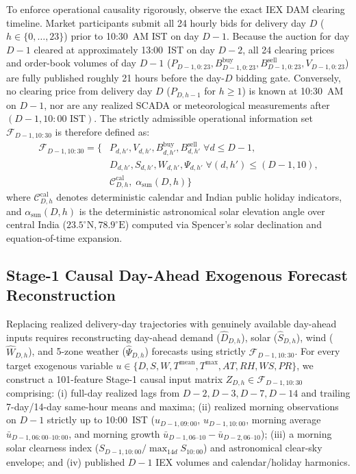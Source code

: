 \documentclass[journal,10pt,twocolumn]{IEEEtran}
\begin{document}
To enforce operational causality rigorously, observe the exact IEX DAM clearing timeline. Market participants submit all 24 hourly bids for delivery day $D$ ($h \in \{0, \dots, 23\}$) prior to 10:30~AM IST on day $D-1$. Because the auction for day $D-1$ cleared at approximately 13:00~IST on day $D-2$, all 24 clearing prices and order-book volumes of day $D-1$ ($P_{D-1, 0:23}, B_{D-1, 0:23}^{\text{buy}}, B_{D-1, 0:23}^{\text{sell}}, V_{D-1, 0:23}$) are fully published roughly 21 hours before the day-$D$ bidding gate. Conversely, no clearing price from delivery day $D$ ($P_{D, h-1}$ for $h \ge 1$) is known at 10:30~AM on $D-1$, nor are any realized SCADA or meteorological measurements after $(D-1, 10:00\text{~IST})$. The strictly admissible operational information set $\mathcal{F}_{D-1, 10:30}$ is therefore defined as:
\begin{equation}
\begin{aligned}
\mathcal{F}_{D-1, 10:30} = \Big\{ & P_{d, h'}, V_{d, h'}, B_{d, h'}^{\text{buy}}, B_{d, h'}^{\text{sell}} \;\forall d \le D-1, \\
& D_{d, h'}, S_{d, h'}, W_{d, h'}, \Psi_{d, h'} \;\forall (d, h') \le (D-1, 10), \\
& \mathcal{C}_{D,h}^{\text{cal}}, \; \alpha_{\text{sun}}(D,h) \Big\}
\end{aligned}
\label{eq:strict_causal_gate}
\end{equation}
where $\mathcal{C}_{D,h}^{\text{cal}}$ denotes deterministic calendar and Indian public holiday indicators, and $\alpha_{\text{sun}}(D,h)$ is the deterministic astronomical solar elevation angle over central India ($23.5^\circ\text{N}, 78.9^\circ\text{E}$) computed via Spencer's solar declination and equation-of-time expansion.

\subsection{Stage-1 Causal Day-Ahead Exogenous Forecast Reconstruction}
Replacing realized delivery-day trajectories with genuinely available day-ahead inputs requires reconstructing day-ahead demand ($\hat{D}_{D,h}$), solar ($\hat{S}_{D,h}$), wind ($\hat{W}_{D,h}$), and 5-zone weather ($\hat{\Psi}_{D,h}$) forecasts using strictly $\mathcal{F}_{D-1, 10:30}$. For every target exogenous variable $u \in \{D, S, W, T^{\text{mean}}, T^{\text{max}}, AT, RH, WS, PR\}$, we construct a 101-feature Stage-1 causal input matrix $Z_{D,h} \in \mathcal{F}_{D-1, 10:30}$ comprising: (i) full-day realized lags from $D-2, D-3, D-7, D-14$ and trailing 7-day/14-day same-hour means and maxima; (ii) realized morning observations on $D-1$ strictly up to 10:00~IST ($u_{D-1, 09:00}$, $u_{D-1, 10:00}$, morning average $\bar{u}_{D-1, 06:00\text{--}10:00}$, and morning growth $\bar{u}_{D-1, 06\text{--}10} - \bar{u}_{D-2, 06\text{--}10}$); (iii) a morning solar clearness index ($S_{D-1, 10:00} / \max_{14d} S_{10:00}$) and astronomical clear-sky envelope; and (iv) published $D-1$ IEX volumes and calendar/holiday harmonics.
\end{document}
